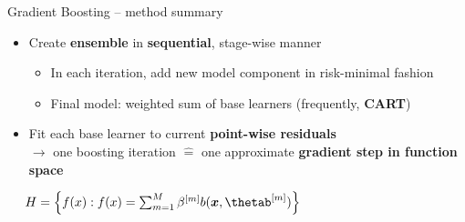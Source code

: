\begin{frame}{Gradient Boosting -- method summary}

 

\medskip


\begin{itemize}
  \item Create \textbf{ensemble} in \textbf{sequential}, stage-wise manner
  \begin{itemize}
    \item In each iteration, add new model component in risk-minimal fashion
    \item Final model: weighted sum of base learners (frequently, \textbf{CART})
  \end{itemize}
  \item Fit each base learner to current \textbf{point-wise residuals} 
  \\ $\rightarrow$ one boosting iteration $\widehat{=}$ one approximate 
  \textbf{gradient step in function space}
\end{itemize}

\medskip

 ~~
$\Hspace = \left\{ \fx: \fx = \sum_{m = 1}^M \betam b(\xv, \thetam) \right\}$


\end{frame}
